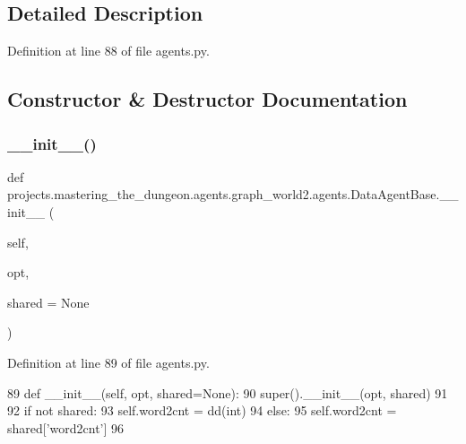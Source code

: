 \subsection{Detailed Description}


Definition at line 88 of file agents.\+py.



\subsection{Constructor \& Destructor Documentation}
\mbox{\label{classprojects_1_1mastering__the__dungeon_1_1agents_1_1graph__world2_1_1agents_1_1DataAgentBase_a101fce933f4b780c5c7db5a491bc8250}} 
\subsubsection{\texorpdfstring{\+\_\+\+\_\+init\+\_\+\+\_\+()}{\_\_init\_\_()}}
{\footnotesize\ttfamily def projects.\+mastering\+\_\+the\+\_\+dungeon.\+agents.\+graph\+\_\+world2.\+agents.\+Data\+Agent\+Base.\+\_\+\+\_\+init\+\_\+\+\_\+ (\begin{DoxyParamCaption}\item[{}]{self,  }\item[{}]{opt,  }\item[{}]{shared = {\ttfamily None} }\end{DoxyParamCaption})}



Definition at line 89 of file agents.\+py.


\begin{DoxyCode}
89     \textcolor{keyword}{def }\_\_init\_\_(self, opt, shared=None):
90         super().\_\_init\_\_(opt, shared)
91 
92         \textcolor{keywordflow}{if} \textcolor{keywordflow}{not} shared:
93             self.word2cnt = dd(int)
94         \textcolor{keywordflow}{else}:
95             self.word2cnt = shared[\textcolor{stringliteral}{'word2cnt'}]
96 
\end{DoxyCode}


